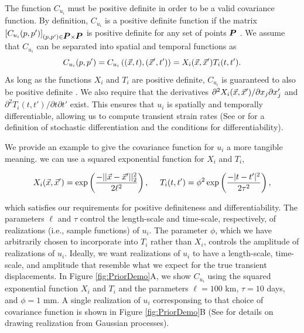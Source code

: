 \documentclass[extra,mreferee]{gji}
\begin{document}
The function $C_{u_i}$ must be positive definite in order to be a
valid covariance function. By definition, $C_{u_i}$ is a positive
definite function if the matrix $[C_{u_i}(p,p')]_{(p,p') \in \points
\times \points}$ is positive definite for any set of points $\points$
\citep[sec. 2.5]{Cressie1992}. We assume that $C_{u_i}$ can be
separated into spatial and temporal functions as
\begin{equation}\label{eq:TransientCovariance}
C_{u_i}(p,p') = C_{u_i}\left((\vec{x},t),(\vec{x}',t')\right) 
              = X_i(\vec{x},\vec{x}')T_i(t,t').
\end{equation}   
As long as the functions $X_i$ and $T_i$ are positive definite,
$C_{u_i}$ is guaranteed to also be positive definite \citep[sec.
4.2.4]{Rasmussen2006}. We also require that the derivatives
$\partial^2 X_i(\vec{x},\vec{x}')/ \partial x_j \partial x_j'$ and
$\partial^2 T_i(t,t') / \partial t \partial t'$ exist. This ensures
that $u_i$ is spatially and temporally differentiable, allowing us to
compute transient strain rates (See \citet[sec. 2.2]{Adler1981} or
\citet[sec. 10A]{Papoulis1991} for a definition of stochastic
differentiation and the conditions for differentiability).


We provide an example to give the covariance function for $u_i$ a more
tangible meaning. we can use a squared exponential function for $X_i$
and $T_i$,

\begin{equation}\label{eq:ExampleCov}
X_i(\pos,\pos') = \exp\left(\frac{-||\pos - \pos'||_2^2}{2\ell^2}\right), \ \ \ \ 
T_i(t,t') = \phi^2 \exp\left(\frac{-|t - t'|^2}{2\tau^2}\right),
\end{equation}

which satisfies our requirements for positive definiteness and
differentiability. The parameters $\ell$ and $\tau$ control the
length-scale and time-scale, respectively, of realizations (i.e.,
sample functions) of $u_i$. The parameter $\phi$, which we have
arbitrarily chosen to incorporate into $T_i$ rather than $X_i$,
controls the amplitude of realizations of $u_i$. Ideally, we want
realizations of $u_i$ to have a length-scale, time-scale, and
amplitude that resemble what we expect for the true transient
displacements. In Figure \ref{fig:PriorDemo}A, we show $C_{u_i}$ using
the squared exponential function $X_i$ and $T_i$ and the parameters
$\ell = 100$ km, $\tau = 10$ days, and $\phi = 1$ mm. A single
realization of $u_i$ corresponsing to that choice of covariance
function is shown in Figure \ref{fig:PriorDemo}B (See \citet[sec.
A3]{Rasmussen2006} for details on drawing realization from Gaussian
processes).
\end{document}
